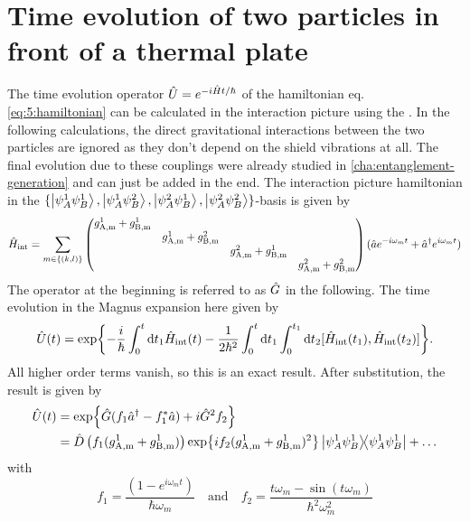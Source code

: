 \section{Time evolution of two particles in front of a thermal plate}\label{apx:thermal-shield-time-evolution}
The time evolution operator $\hat{U}=e^{-i\hat{H}t/\hbar}$ of the hamiltonian eq. \eqref{eq:5:hamiltonian} can be calculated in the interaction picture using the  \cite{Blanes_2009}.
In the following calculations, the direct gravitational interactions between the two particles are ignored as they don't depend on the shield vibrations at all. The final evolution due to these couplings were already studied in \cref{cha:entanglement-generation} and can just be added in the end. 
The interaction picture hamiltonian in the $\{\ket{\psi^1_A\psi^1_B},\ket{\psi^1_A\psi^2_B},\ket{\psi^2_A\psi^1_B},\ket{\psi^2_A\psi^2_B}\}$-basis is given by
\begin{equation}
  \hat{H}_\mathrm{int} = \sum_{m\in\{(k,l)\}} \begin{pmatrix}
    g^1_\mathrm{A,m} + g^1_\mathrm{B,m}& & & \\
    & g^1_\mathrm{A,m} + g^2_\mathrm{B,m}& & \\
    & & g^2_\mathrm{A,m} + g^1_\mathrm{B,m}& \\
    & & & g^2_\mathrm{A,m} + g^2_\mathrm{B,m}
  \end{pmatrix}(\hat{a}e^{-i\omega_m t}+\hat{a}^\dagger e^{i\omega_m t})
\end{equation}
The operator at the beginning is referred to as $\hat{G}$ in the following.
The time evolution in the Magnus expansion here given by \cite{Blanes_2009}
\begin{equation}
  \hat{U}(t) = \exp{-\frac{i}{\hbar}\int_{0}^{t}\dd t_1 \hat{H}_\mathrm{int}(t)-\frac{1}{2\hbar^2}\int_{0}^{t}\dd t_1 \int_{0}^{t_1}\dd t_2 [\hat{H}_\mathrm{int}(t_1),\hat{H}_\mathrm{int}(t_2)]} .
\end{equation}
All higher order terms vanish, so this is an exact result.
After substitution, the result is given by
\begin{align}
  \hat{U}(t) &= \exp{\hat{G}(f_1\hat{a}^\dagger - f_1^*\hat{a}) + i \hat{G}^2 f_2} \\ 
  &= \hat{D}\left(f_1(g^1_\mathrm{A,m} + g^1_\mathrm{B,m})\right) \exp{i f_2 (g^1_\mathrm{A,m} + g^1_\mathrm{B,m})^2} \ketbra{\psi^1_A\psi^1_B} + \dots
\end{align}
with
\begin{equation}
  f_1 = \frac{(1-e^{i\omega_m t})}{\hbar \omega_m}
  \quad \text{and} \quad
  f_2 = \frac{t\omega_m - \sin(t \omega_m)}{\hbar^2 \omega_m^2}
\end{equation}
